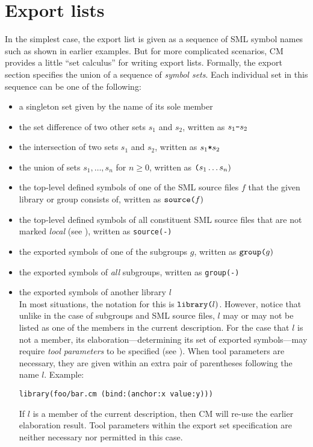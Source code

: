 %

\chapter{Export lists}
\label{chap:exportcalculus}

In the simplest case, the export list is given as a sequence of SML
symbol names such as shown in earlier examples.  But for more
complicated scenarios, CM provides a little ``set calculus'' for
writing export lists.  Formally, the export section specifies the
union of a sequence of {\em symbol sets}.  Each individual set in this
sequence can be one of the following:

\begin{itemize}\setlength{\itemsep}{0pt}
\item a singleton set given by the name of its sole member
\item the set difference of two other sets $s_1$ and $s_2$, written as $s_1
\mbox{\tt -} s_2$
\item the intersection of two sets $s_1$ and $s_2$, written as $s_1
\mbox{\tt *} s_2$
\item the union of sets $s_1, \ldots, s_n$ for $n \ge 0$, written as
$\mbox{\tt (} s_1 \ldots s_n \mbox{)}$
\item the top-level defined symbols of one of the SML source files $f$
that the given library or group consists of, written as
$\mbox{\tt source(}f\mbox{)}$
\item the top-level defined symbols of all constituent SML source
files that are not marked {\em local} (see ),
written as {\tt source(-)}
\item the exported symbols of one of the subgroups $g$, written as
$\mbox{\tt group(}g\mbox{)}$
\item the exported symbols of {\em all} subgroups, written as
{\tt group(-)}
\item the exported symbols of another library $l$ \\
In most situations, the notation for this is $\mbox{\tt library(}l\mbox{)}$.
However, notice that unlike in the case of subgroups and SML source
files, $l$ may or may not be listed as one of the members in the
current description.  For the case that $l$ is not a member, its
elaboration---determining its set of exported symbols---may require
{\em tool parameters} to be specified (see
).  When tool parameters are necessary,
they are given within an extra pair of parentheses following the name
$l$.  Example:
\begin{lstlisting}[language=CM]
  library(foo/bar.cm (bind:(anchor:x value:y)))
\end{lstlisting}%
\noindent If $l$ is a member of the current description, then CM will
re-use the earlier elaboration result.  Tool parameters within the
export set specification are neither necessary nor permitted in this case.
\end{itemize}


